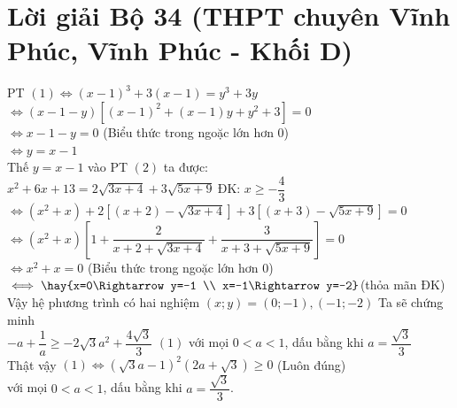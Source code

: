 \section{Lời giải Bộ 34 (THPT chuyên Vĩnh Phúc, Vĩnh Phúc - Khối D)}

\lgi
\vspace{5cm}

\lgi 
PT $(1)\iff (x-1)^3+3(x-1)=y^3+3y$\\
$\iff (x-1-y)\left[(x-1)^2+(x-1)y+y^2+3\right]=0$\\
$\iff x-1-y=0$ (Biểu thức trong ngoặc lớn hơn $0$)\\
$\iff y=x-1$\\
Thế $y=x-1$ vào PT $(2)$ ta được:\\
$x^2+6x+13=2\sqrt{3x+4}+3\sqrt{5x+9}~$ĐK: $x\ge -\dfrac{4}{3}$\\
$\iff (x^2+x)+2\left[(x+2)-\sqrt{3x+4}\right]+3\left[(x+3)-\sqrt{5x+9}\right]=0$\\
$\iff (x^2+x)\left[1+\dfrac{2}{x+2+\sqrt{3x+4}}+\dfrac{3}{x+3+\sqrt{5x+9}}\right]=0$\\
$\iff x^2+x=0$ (Biểu thức trong ngoặc lớn hơn $0$)\\
$\iff \hay{x=0\Rightarrow y=-1 \\ x=-1\Rightarrow y=-2}$(thỏa mãn ĐK)\\
Vậy hệ phương trình có hai nghiệm $(x;y)=(0;-1),(-1;-2)$
\lgi 
Ta sẽ chứng minh \\
$-a+\dfrac{1}{a}\ge -2\sqrt{3}a^2+\dfrac{4\sqrt{3}}{3}$ $(1)$ với mọi $0<a<1$, dấu bằng khi $a=\dfrac{\sqrt{3}}{3}$\\
Thật vậy $(1)\iff \left(\sqrt{3}a-1\right)^2\left(2a+\sqrt{3}\right)\ge 0$ (Luôn đúng)\\
với mọi $0<a<1$, dấu bằng khi $a=\dfrac{\sqrt{3}}{3}$.\\
